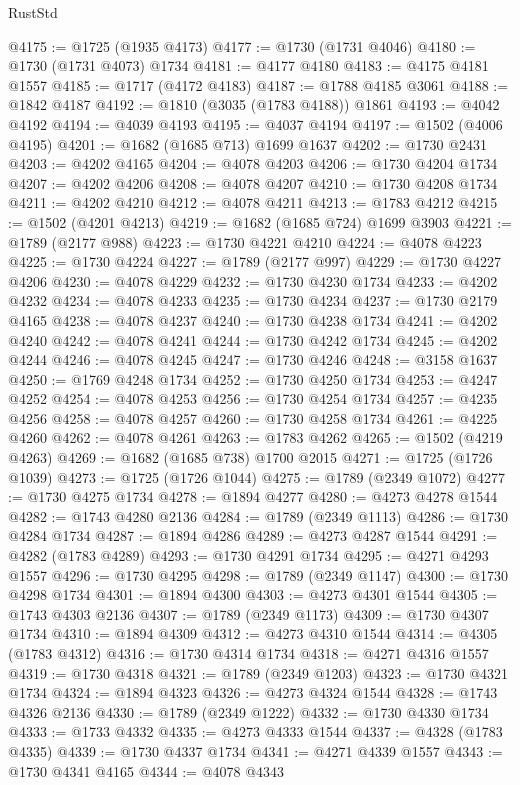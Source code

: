 \begin{lexlean}{RustStd}
\begin{coremodule}
@4175 := @1725 (@1935 @4173)
@4177 := @1730 (@1731 @4046)
@4180 := @1730 (@1731 @4073) @1734
@4181 := @4177 @4180
@4183 := @4175 @4181 @1557
@4185 := @1717 (@4172 @4183)
@4187 := @1788 @4185 @3061
@4188 := @1842 @4187
@4192 := @1810 (@3035 (@1783 @4188)) @1861
@4193 := @4042 @4192
@4194 := @4039 @4193
@4195 := @4037 @4194
@4197 := @1502 (@4006 @4195)
@4201 := @1682 (@1685 @713) @1699 @1637
@4202 := @1730 @2431
@4203 := @4202 @4165
@4204 := @4078 @4203
@4206 := @1730 @4204 @1734
@4207 := @4202 @4206
@4208 := @4078 @4207
@4210 := @1730 @4208 @1734
@4211 := @4202 @4210
@4212 := @4078 @4211
@4213 := @1783 @4212
@4215 := @1502 (@4201 @4213)
@4219 := @1682 (@1685 @724) @1699 @3903
@4221 := @1789 (@2177 @988)
@4223 := @1730 @4221 @4210
@4224 := @4078 @4223
@4225 := @1730 @4224
@4227 := @1789 (@2177 @997)
@4229 := @1730 @4227 @4206
@4230 := @4078 @4229
@4232 := @1730 @4230 @1734
@4233 := @4202 @4232
@4234 := @4078 @4233
@4235 := @1730 @4234
@4237 := @1730 @2179 @4165
@4238 := @4078 @4237
@4240 := @1730 @4238 @1734
@4241 := @4202 @4240
@4242 := @4078 @4241
@4244 := @1730 @4242 @1734
@4245 := @4202 @4244
@4246 := @4078 @4245
@4247 := @1730 @4246
@4248 := @3158 @1637
@4250 := @1769 @4248 @1734
@4252 := @1730 @4250 @1734
@4253 := @4247 @4252
@4254 := @4078 @4253
@4256 := @1730 @4254 @1734
@4257 := @4235 @4256
@4258 := @4078 @4257
@4260 := @1730 @4258 @1734
@4261 := @4225 @4260
@4262 := @4078 @4261
@4263 := @1783 @4262
@4265 := @1502 (@4219 @4263)
@4269 := @1682 (@1685 @738) @1700 @2015
@4271 := @1725 (@1726 @1039)
@4273 := @1725 (@1726 @1044)
@4275 := @1789 (@2349 @1072)
@4277 := @1730 @4275 @1734
@4278 := @1894 @4277
@4280 := @4273 @4278 @1544
@4282 := @1743 @4280 @2136
@4284 := @1789 (@2349 @1113)
@4286 := @1730 @4284 @1734
@4287 := @1894 @4286
@4289 := @4273 @4287 @1544
@4291 := @4282 (@1783 @4289)
@4293 := @1730 @4291 @1734
@4295 := @4271 @4293 @1557
@4296 := @1730 @4295
@4298 := @1789 (@2349 @1147)
@4300 := @1730 @4298 @1734
@4301 := @1894 @4300
@4303 := @4273 @4301 @1544
@4305 := @1743 @4303 @2136
@4307 := @1789 (@2349 @1173)
@4309 := @1730 @4307 @1734
@4310 := @1894 @4309
@4312 := @4273 @4310 @1544
@4314 := @4305 (@1783 @4312)
@4316 := @1730 @4314 @1734
@4318 := @4271 @4316 @1557
@4319 := @1730 @4318
@4321 := @1789 (@2349 @1203)
@4323 := @1730 @4321 @1734
@4324 := @1894 @4323
@4326 := @4273 @4324 @1544
@4328 := @1743 @4326 @2136
@4330 := @1789 (@2349 @1222)
@4332 := @1730 @4330 @1734
@4333 := @1733 @4332
@4335 := @4273 @4333 @1544
@4337 := @4328 (@1783 @4335)
@4339 := @1730 @4337 @1734
@4341 := @4271 @4339 @1557
@4343 := @1730 @4341 @4165
@4344 := @4078 @4343

\end{coremodule}
\end{lexlean}
